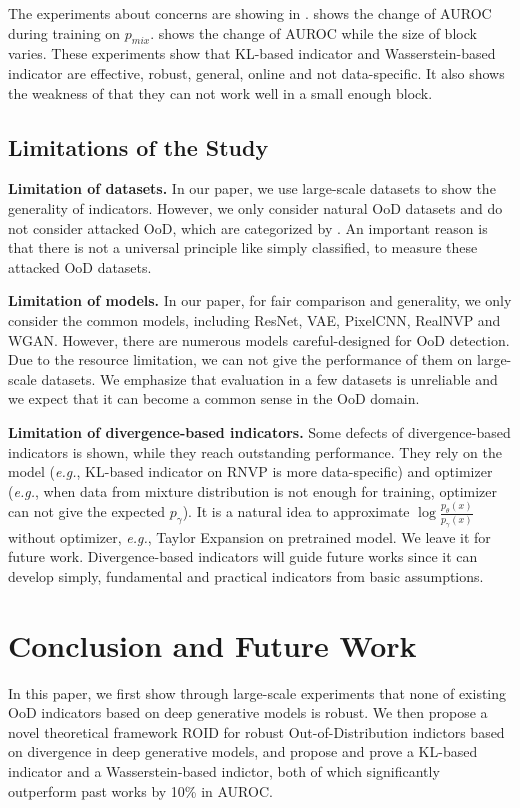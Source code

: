 \documentclass[letterpaper]{article} %
\newcommand{\EG}{\textit{e.g.}, }
\newcommand{\pmix}{p_{mix}}
\begin{document}
The experiments about concerns are showing in .  shows the change of AUROC during training on $\pmix$. 
 shows the change of AUROC while the size of block varies. 
These experiments show that KL-based indicator and Wasserstein-based indicator are effective, robust, general, online and not data-specific. It also shows the weakness of that they can not work well in a small enough block. 

\subsection{Limitations of the Study} 

\noindent \textbf{Limitation of datasets.}
In our paper, we use large-scale datasets to show the generality of indicators. However, we only consider natural OoD datasets and do not consider attacked OoD, which are categorized by \cite{chen2020robust}. An important reason is that there is not a universal principle like simply classified, to measure these attacked OoD datasets. 

\noindent \textbf{Limitation of models.} 
In our paper, for fair comparison and generality, we only consider the common models, including ResNet, VAE, PixelCNN, RealNVP and WGAN. However, there are numerous models careful-designed for OoD detection. Due to the resource limitation, we can not give the performance of them on large-scale datasets. We emphasize that evaluation in a few datasets is unreliable and we expect that it can become a common sense in the OoD domain. 

\noindent \textbf{Limitation of divergence-based indicators.} 
Some defects of divergence-based indicators is shown, while they reach outstanding performance. They rely on the model (\EG KL-based indicator on RNVP is more data-specific) and optimizer (\EG when data from mixture distribution is not enough for training, optimizer can not give the expected $p_\gamma$). It is a natural idea to approximate $\log \frac{ p_\theta(x)}{p_\gamma(x)}$ without optimizer, \EG Taylor Expansion on pretrained model. We leave it for future work. 
Divergence-based indicators will guide future works since it can develop simply, fundamental and practical indicators from basic assumptions. 

\section{Conclusion and Future Work}
In this paper, we first show through large-scale experiments that none of existing OoD indicators based on deep generative models is robust. We then propose a novel theoretical framework ROID for robust Out-of-Distribution indictors based on divergence in deep generative models, and propose and prove a KL-based indicator and a Wasserstein-based indictor, both of which significantly outperform past works by 10\% in AUROC.
\end{document}
